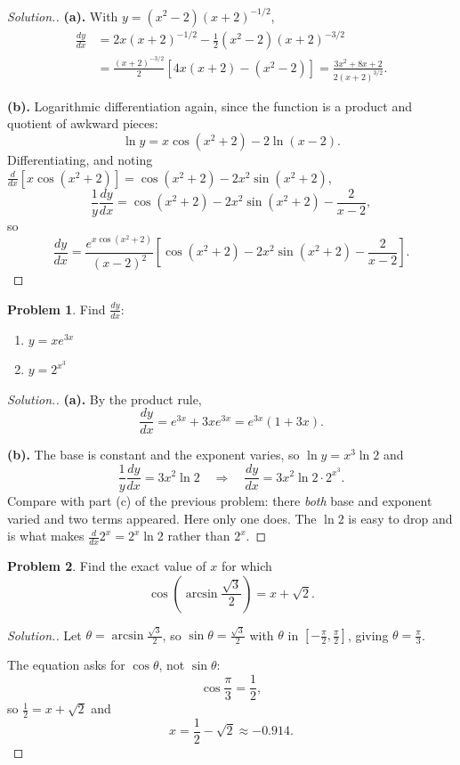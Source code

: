 \documentclass[11pt,a4paper]{article}
\theoremstyle{definition}
\newtheorem{problemx}{Problem}[section]
\newenvironment{problem}{\begin{problemx}}{\end{problemx}}
\newenvironment{solution}
  {\renewcommand{\qedsymbol}{}\begin{proof}[\textit{Solution}.]}
  {\end{proof}}
\begin{document}
\begin{solution}
\textbf{(a).} With $y=\left(x^{2}-2\right)(x+2)^{-1/2}$,
\begin{align*}
\frac{dy}{dx}&=2x(x+2)^{-1/2}-\tfrac{1}{2}\left(x^{2}-2\right)(x+2)^{-3/2}\\
&=\frac{(x+2)^{-3/2}}{2}\left[4x(x+2)-\left(x^{2}-2\right)\right]
=\frac{3x^{2}+8x+2}{2(x+2)^{3/2}} .
\end{align*}

\textbf{(b).} Logarithmic differentiation again, since the function is a product
and quotient of awkward pieces:
$$\ln y=x\cos\left(x^{2}+2\right)-2\ln(x-2).$$
Differentiating, and noting
$\frac{d}{dx}\left[x\cos\left(x^{2}+2\right)\right]
=\cos\left(x^{2}+2\right)-2x^{2}\sin\left(x^{2}+2\right)$,
$$\frac{1}{y}\frac{dy}{dx}
=\cos\left(x^{2}+2\right)-2x^{2}\sin\left(x^{2}+2\right)-\frac{2}{x-2},$$
so
$$\frac{dy}{dx}=\frac{e^{x\cos\left(x^{2}+2\right)}}{(x-2)^{2}}
\left[\cos\left(x^{2}+2\right)-2x^{2}\sin\left(x^{2}+2\right)-\frac{2}{x-2}\right].$$
\end{solution}

\begin{problem}
Find $\frac{dy}{dx}$:
\begin{enumerate}
\item[(a).] $y=xe^{3x}$
\item[(b).] $y=2^{x^{3}}$
\end{enumerate}
\end{problem}

\begin{solution}
\textbf{(a).} By the product rule,
$$\frac{dy}{dx}=e^{3x}+3xe^{3x}=e^{3x}(1+3x).$$

\textbf{(b).} The base is constant and the exponent varies, so
$\ln y=x^{3}\ln 2$ and
$$\frac{1}{y}\frac{dy}{dx}=3x^{2}\ln 2
\quad \Longrightarrow\quad 
\frac{dy}{dx}=3x^{2}\ln 2\cdot 2^{x^{3}} .$$
Compare with part (c) of the previous problem: there \emph{both} base and exponent
varied and two terms appeared. Here only one does. The $\ln 2$ is easy to drop and
is what makes $\frac{d}{dx}2^{x}=2^{x}\ln 2$ rather than $2^{x}$.
\end{solution}


\begin{problem}
Find the exact value of $x$ for which
$$\cos\left(\arcsin\frac{\sqrt{3}}{2}\right)=x+\sqrt{2}.$$
\end{problem}

\begin{solution}
Let $\theta=\arcsin\frac{\sqrt{3}}{2}$, so $\sin\theta=\frac{\sqrt{3}}{2}$ with
$\theta$ in $\left[-\frac{\pi}{2},\frac{\pi}{2}\right]$, giving
$\theta=\frac{\pi}{3}$.

The equation asks for $\cos\theta$, not $\sin\theta$:
$$\cos\frac{\pi}{3}=\frac{1}{2},$$
so $\frac{1}{2}=x+\sqrt{2}$ and
$$x=\frac{1}{2}-\sqrt{2}\approx -0.914 .$$
\end{solution}
\end{document}
